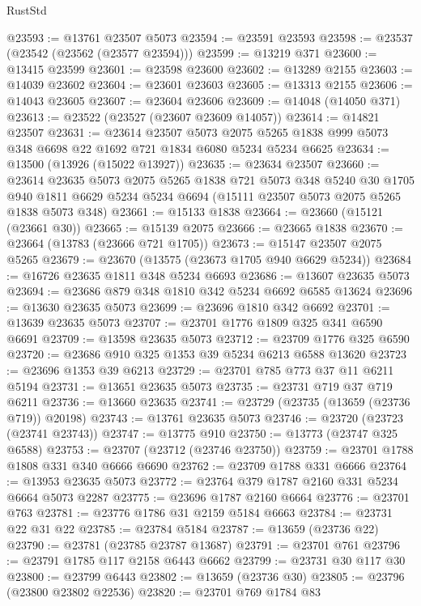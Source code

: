 \begin{lexlean}{RustStd}
\begin{coremodule}
@23593 := @13761 @23507 @5073
@23594 := @23591 @23593
@23598 := @23537 (@23542 (@23562 (@23577 @23594)))
@23599 := @13219 @371
@23600 := @13415 @23599
@23601 := @23598 @23600
@23602 := @13289 @2155
@23603 := @14039 @23602
@23604 := @23601 @23603
@23605 := @13313 @2155
@23606 := @14043 @23605
@23607 := @23604 @23606
@23609 := @14048 (@14050 @371)
@23613 := @23522 (@23527 (@23607 @23609 @14057))
@23614 := @14821 @23507
@23631 := @23614
    @23507
    @5073
    @2075
    @5265
    @1838
    @999
    @5073
    @348
    @6698
    @22
    @1692
    @721
    @1834
    @6080
    @5234
    @5234
    @6625
@23634 := @13500 (@13926 (@15022 @13927))
@23635 := @23634 @23507
@23660 := @23614
    @23635
    @5073
    @2075
    @5265
    @1838
    @721
    @5073
    @348
    @5240
    @30
    @1705
    @940
    @1811
    @6629
    @5234
    @5234
    @6694
    (@15111 @23507 @5073 @2075 @5265 @1838 @5073 @348)
@23661 := @15133 @1838
@23664 := @23660 (@15121 (@23661 @30))
@23665 := @15139 @2075
@23666 := @23665 @1838
@23670 := @23664 (@13783 (@23666 @721 @1705))
@23673 := @15147 @23507 @2075 @5265
@23679 := @23670 (@13575 (@23673 @1705 @940 @6629 @5234))
@23684 := @16726 @23635 @1811 @348 @5234 @6693
@23686 := @13607 @23635 @5073
@23694 := @23686 @879 @348 @1810 @342 @5234 @6692 @6585 @13624
@23696 := @13630 @23635 @5073
@23699 := @23696 @1810 @342 @6692
@23701 := @13639 @23635 @5073
@23707 := @23701 @1776 @1809 @325 @341 @6590 @6691
@23709 := @13598 @23635 @5073
@23712 := @23709 @1776 @325 @6590
@23720 := @23686 @910 @325 @1353 @39 @5234 @6213 @6588 @13620
@23723 := @23696 @1353 @39 @6213
@23729 := @23701 @785 @773 @37 @11 @6211 @5194
@23731 := @13651 @23635 @5073
@23735 := @23731 @719 @37 @719 @6211
@23736 := @13660 @23635
@23741 := @23729 (@23735 (@13659 (@23736 @719)) @20198)
@23743 := @13761 @23635 @5073
@23746 := @23720 (@23723 (@23741 @23743))
@23747 := @13775 @910
@23750 := @13773 (@23747 @325 @6588)
@23753 := @23707 (@23712 (@23746 @23750))
@23759 := @23701 @1788 @1808 @331 @340 @6666 @6690
@23762 := @23709 @1788 @331 @6666
@23764 := @13953 @23635 @5073
@23772 := @23764 @379 @1787 @2160 @331 @5234 @6664 @5073 @2287
@23775 := @23696 @1787 @2160 @6664
@23776 := @23701 @763
@23781 := @23776 @1786 @31 @2159 @5184 @6663
@23784 := @23731 @22 @31 @22
@23785 := @23784 @5184
@23787 := @13659 (@23736 @22)
@23790 := @23781 (@23785 @23787 @13687)
@23791 := @23701 @761
@23796 := @23791 @1785 @117 @2158 @6443 @6662
@23799 := @23731 @30 @117 @30
@23800 := @23799 @6443
@23802 := @13659 (@23736 @30)
@23805 := @23796 (@23800 @23802 @22536)
@23820 := @23701
    @769
    @1784
    @83

\end{coremodule}
\end{lexlean}
